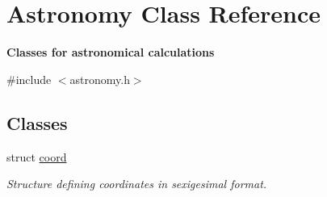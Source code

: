 \hypertarget{class_astronomy}{\section{Astronomy Class Reference}
\label{class_astronomy}
}


{\bfseries Classes for astronomical calculations}  




{\ttfamily \#include $<$astronomy.\-h$>$}

\subsection*{Classes}
\begin{DoxyCompactItemize}
\item 
struct \hyperlink{struct_astronomy_1_1coord}{coord}
\begin{DoxyCompactList}\small\item\em Structure defining coordinates in sexigesimal format. \end{DoxyCompactList}\end{DoxyCompactItemize}

